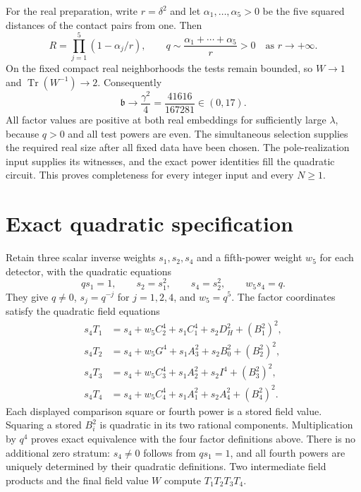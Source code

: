 \documentclass[11pt,a4paper]{article}
\DeclareMathOperator{\Tr}{Tr}\DeclareMathOperator{\Nm}{Nm}
\begin{document}
For the real preparation, write $r=\delta^2$ and let
$\alpha_1,\ldots,\alpha_5>0$ be the five squared distances of the
contact pairs from one. Then
\[
 R=\prod_{j=1}^{5}(1-\alpha_j/r),\qquad
 q\sim\frac{\alpha_1+\cdots+\alpha_5}r>0
 \quad\text{as }r\longrightarrow+\infty.
\]
On the fixed compact real neighborhoods the tests remain bounded, so
$W\to1$ and $\Tr(W^{-1})\to2$. Consequently
\[
              \mathfrak b\longrightarrow\frac{\gamma^2}{4}
                              =\frac{41616}{167281}\in(0,17).
\]
All factor values are positive at both real embeddings for sufficiently
large $\lambda$, because $q>0$ and all test powers are even.
The simultaneous selection supplies the required real size after all
fixed data have been chosen. The pole-realization input supplies its
witnesses, and the exact power identities fill the quadratic circuit.
This proves completeness for every integer input and every $N\ge1$.

\section{Exact quadratic specification}
Retain three scalar inverse weights $s_1,s_2,s_4$ and a fifth-power
weight $w_5$ for each detector, with the quadratic equations
\begin{equation}\label{eq:inverseweights}
 qs_1=1,\qquad s_2=s_1^2,\qquad s_4=s_2^2,\qquad w_5s_4=q.
\end{equation}
They give $q\ne0$, $s_j=q^{-j}$ for $j=1,2,4$, and $w_5=q^5$.
The factor coordinates satisfy the quadratic field equations
\begin{equation}\label{eq:clearedfactors}
\begin{split}
 s_4T_1&=s_4+w_5C_2^4+s_1C_1^4+s_2D_H^2+(B_1^2)^2,\\
 s_4T_2&=s_4+w_5G^4+s_1A_3^2+s_2B_0^2+(B_2^2)^2,\\
 s_4T_3&=s_4+w_5C_3^4+s_1A_2^2+s_2I^4+(B_3^2)^2,\\
 s_4T_4&=s_4+w_5C_4^4+s_1A_1^2+s_2A_4^2+(B_4^2)^2.
\end{split}
\end{equation}
Each displayed comparison square or fourth power is a stored field
value. Squaring a stored $B_i^2$ is quadratic in its two rational
components. Multiplication by $q^4$ proves exact equivalence with
the four factor definitions above. There is no additional zero stratum:
$s_4\ne0$ follows from $qs_1=1$, and all fourth powers are
uniquely determined by their quadratic definitions.
Two intermediate field products and the final field value $W$
compute $T_1T_2T_3T_4$.
\end{document}
